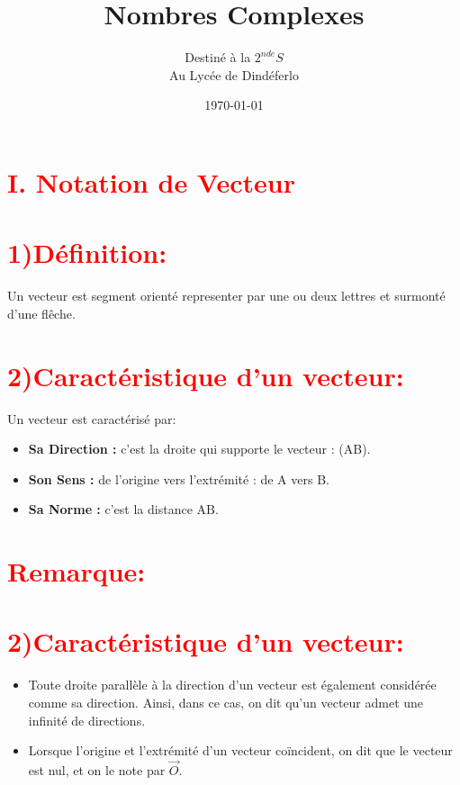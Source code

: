 \documentclass[12pt]{article}
\author{Destiné à la $2^{nde}S$\\Au Lycée de Dindéferlo}
\title{\textbf{Nombres Complexes}}
\date{\today}
\begin{document}
\maketitle
\newpage

\section*{\textcolor{red}{\textbf{I. Notation de Vecteur}}}
\section*{\textcolor{red}{\textbf{1)Définition:}}}

Un vecteur est segment orienté representer par une ou deux lettres et surmonté d'une flêche.


\section*{\textcolor{red}{\textbf{2)Caractéristique d'un vecteur:}}}

Un vecteur est caractérisé par:\\

\begin{itemize}
  \item \textbf{Sa Direction :} c'est la droite qui supporte le vecteur : (AB).
  \item \textbf{Son Sens :} de l'origine vers l'extrémité : de A vers B.
  \item \textbf{Sa Norme :} c'est la distance AB.
\end{itemize}

\section*{\textcolor{red}{\textbf{Remarque:}}} 
\section*{\textcolor{red}{\textbf{2)Caractéristique d'un vecteur:}}}
\begin{itemize}
  \item Toute droite parallèle à la direction d'un vecteur est également considérée comme sa direction. Ainsi, dans ce cas, on dit qu'un vecteur admet une infinité de directions.
  \item Lorsque l'origine et l'extrémité d'un vecteur coïncident, on dit que le vecteur est nul, et on le note par $\vec{O}$.
\end{itemize}
\end{document}
